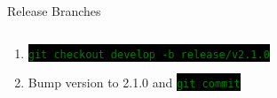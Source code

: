 \documentclass[
14pt,
aspectratio=169,
usenames,
dvipsnames,
x11names]{beamer}
\newcommand{\code}[1]{{\small\setlength{\fboxsep}{2pt}\colorbox{black}{\textcolor{green}{\texttt{#1}}}}}
\newcommand{\shadowbox}[2]{%
  \hbox{%
    \begin{tcolorbox}[beamer,
      width=#1,
      drop fuzzy shadow=black,
      arc=0pt,
      boxsep=0pt,
      left=0pt,right=0pt,top=0pt,bottom=0pt,
      ]%
      #2
    \end{tcolorbox}
  }
}
\begin{document}
\begin{frame}{Release Branches}
  \begin{columns}
    \pause
    \begin{column}{.65\linewidth}
      \minipage[c][0.75\textheight][s]{\columnwidth}
      \begin{enumerate}[<+->] \setlength{\itemsep}{\fill}
      \item \code{git checkout develop -b release/v2.1.0}
      \item Bump version to 2.1.0 and \code{git commit}

\end{enumerate}
\end{column}
\end{columns}
\end{frame}
\end{document}
